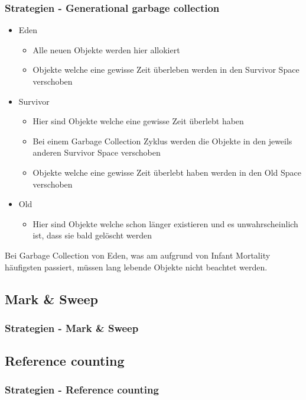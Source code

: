 \documentclass{beamer}
\begin{document}
            \begin{frame}
                \frametitle{Strategien - Generational garbage collection}
                \begin{itemize}
                    \item Eden
                    \begin{itemize}
                        \item Alle neuen Objekte werden hier allokiert
                        \item Objekte welche eine gewisse Zeit überleben werden in den Survivor Space verschoben
                    \end{itemize}
                    \item Survivor
                    \begin{itemize}
                        \item Hier sind Objekte welche eine gewisse Zeit überlebt haben
                        \item Bei einem Garbage Collection Zyklus werden die Objekte in den jeweils anderen Survivor Space verschoben
                        \item Objekte welche eine gewisse Zeit überlebt haben werden in den Old Space verschoben
                    \end{itemize}
                    \item Old
                    \begin{itemize}
                        \item Hier sind Objekte welche schon länger existieren und es unwahrscheinlich ist, dass sie bald gelöscht werden
                    \end{itemize}
                \end{itemize}
                Bei Garbage Collection von Eden, was am aufgrund von Infant Mortality häufigsten passiert, müssen lang lebende Objekte nicht beachtet werden.
            \end{frame}

        \subsection{Mark \& Sweep}
            \begin{frame}
                \frametitle{Strategien - Mark \& Sweep}
            \end{frame}

        \subsection{Reference counting}
            \begin{frame}
                \frametitle{Strategien - Reference counting}
            \end{frame}
\end{document}
